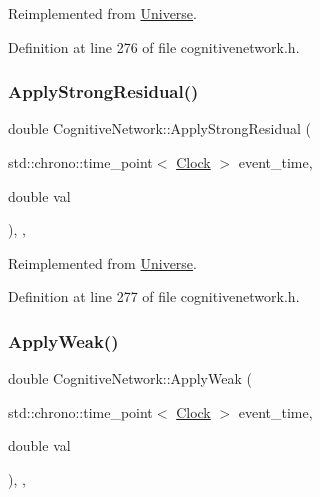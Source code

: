 Reimplemented from \hyperlink{class_universe_a62789bcff84bd750b0366004381e2fdd}{Universe}.



Definition at line 276 of file cognitivenetwork.\+h.

\mbox{\label{class_cognitive_network_a8b60fdb81d89a3a74d6c06cb29e7aad3}} 
\subsubsection{\texorpdfstring{Apply\+Strong\+Residual()}{ApplyStrongResidual()}}
{\footnotesize\ttfamily double Cognitive\+Network\+::\+Apply\+Strong\+Residual (\begin{DoxyParamCaption}\item[{std\+::chrono\+::time\+\_\+point$<$ \hyperlink{universe_8h_a0ef8d951d1ca5ab3cfaf7ab4c7a6fd80}{Clock} $>$}]{event\+\_\+time,  }\item[{double}]{val }\end{DoxyParamCaption})\hspace{0.3cm}{\ttfamily [inline]}, {\ttfamily [final]}, {\ttfamily [virtual]}}



Reimplemented from \hyperlink{class_universe_af7becebb347be9a85541d96a3eca1ca7}{Universe}.



Definition at line 277 of file cognitivenetwork.\+h.

\mbox{\label{class_cognitive_network_a46a15b24bd61049fa1c4f635268086a1}} 
\subsubsection{\texorpdfstring{Apply\+Weak()}{ApplyWeak()}}
{\footnotesize\ttfamily double Cognitive\+Network\+::\+Apply\+Weak (\begin{DoxyParamCaption}\item[{std\+::chrono\+::time\+\_\+point$<$ \hyperlink{universe_8h_a0ef8d951d1ca5ab3cfaf7ab4c7a6fd80}{Clock} $>$}]{event\+\_\+time,  }\item[{double}]{val }\end{DoxyParamCaption})\hspace{0.3cm}{\ttfamily [inline]}, {\ttfamily [final]}, {\ttfamily [virtual]}}



